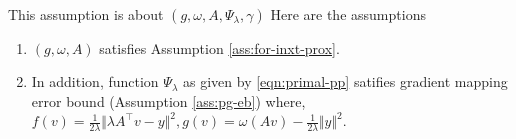 \documentclass[12pt]{article}
\begin{document}
    \begin{assumption}\;\label{ass:eb-for-pp}\\
        This assumption is about $(g, \omega, A, \Psi_\lambda, \gamma)$
        Here are the assumptions
        \begin{enumerate}[nosep]
            \item $(g, \omega, A)$ satisfies Assumption \ref{ass:for-inxt-prox}. 
            \item In addition, function $\Psi_\lambda$ as given by \eqref{eqn:primal-pp} satifies gradient mapping error bound (Assumption \ref{ass:pg-eb}) where, $f(v) = \frac{1}{2\lambda}\Vert \lambda A^\top v - y\Vert^2, g(v) = \omega(A v) - \frac{1}{2\lambda}\Vert y\Vert^2$. 
        \end{enumerate}
    \end{assumption}
\end{document}
